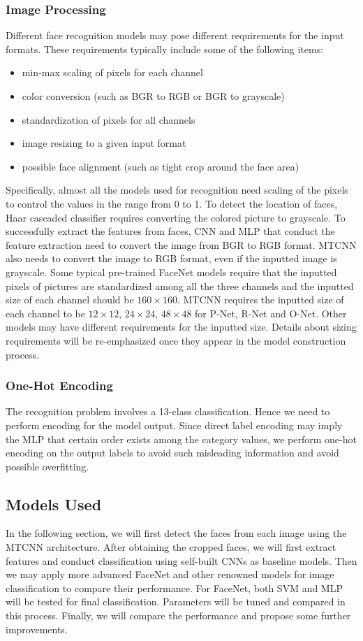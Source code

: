 \subsubsection{Image Processing}
Different face recognition models may pose different requirements for the input formats. These requirements typically include some of the following items:
\begin{itemize}
    \item min-max scaling of pixels for each channel
    \item color conversion (such as BGR to RGB or BGR to grayscale)
    \item standardization of pixels for all channels
    \item image resizing to a given input format
    \item possible face alignment (such as tight crop around the face area)
\end{itemize}
Specifically, almost all the models used for recognition need scaling of the pixels to control the values in the range from 0 to 1. To detect the location of faces, Haar cascaded classifier requires converting the colored picture to grayscale. To successfully extract the features from faces,  CNN and MLP that conduct the feature extraction need to convert the image from BGR to RGB format. MTCNN also needs to convert the image to RGB format, even if the inputted image is grayscale. Some typical pre-trained FaceNet models require that the inputted pixels of pictures are standardized among all the three channels and the inputted size of each channel should be $160\times 160$. MTCNN requires the inputted size of each channel to be $12\times 12$, $24\times 24$, $48\times 48$ for P-Net, R-Net and O-Net. Other models may have different requirements for the inputted size. Details about sizing requirements will be re-emphasized once they appear in the model construction process. 

\subsubsection{One-Hot Encoding}
The recognition problem involves a 13-class classification. Hence we need to perform encoding for the model output. Since direct label encoding may imply the MLP that certain order exists among the category values, we perform one-hot encoding on the output labels to avoid such misleading information and avoid possible overfitting.

\subsection{Models Used}
In the following section, we will first detect the faces from each image using the MTCNN architecture. After obtaining the cropped faces, we will first extract features and conduct classification using self-built CNNs as baseline models. Then we may apply more advanced FaceNet and other renowned models for image classification to compare their performance. For FaceNet, both SVM and MLP will be tested for final classification. Parameters will be tuned and compared in this process. Finally, we will compare the performance and propose some further improvements.

